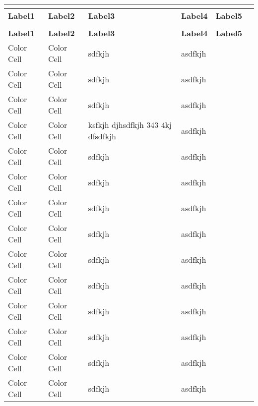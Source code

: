 \documentclass{article}
\begin{document}
\newpage
\renewcommand{\baselinestretch}{1.05}
\begin{center}
\LARGE
\keepXColumns
{}%
\begin{tabularx}{\textwidth}
{| Y@{} | s@{} | Y@{} | Y@{} | Y@{} | Y@{} |}
\\
\hline
\textbf{Label1} &\textbf{Label2} &\textbf{Label3} &\textbf{Label4} &\textbf{Label5}\\
\hline
\endfirsthead%
\\
\hline
\textbf{Label1} &\textbf{Label2} &\textbf{Label3} &\textbf{Label4} &\textbf{Label5}\\
\hline
\endhead%
Color Cell & Color Cell &sdfkjh  & asdfkjh & \\
\hline
Color Cell & Color Cell &sdfkjh  & asdfkjh & \\
\hline
Color Cell & Color Cell &sdfkjh  & asdfkjh & \\
\hline
Color Cell & Color Cell & ksfkjh djhsdfkjh 343 4kj dfsdfkjh  & asdfkjh & \\
\hline
Color Cell & Color Cell &sdfkjh  & asdfkjh & \\
\hline
Color Cell & Color Cell &sdfkjh  & asdfkjh & \\
\hline
Color Cell & Color Cell &sdfkjh  & asdfkjh & \\
\hline
Color Cell & Color Cell &sdfkjh  & asdfkjh & \\
\hline
Color Cell & Color Cell &sdfkjh  & asdfkjh & \\
\hline
Color Cell & Color Cell &sdfkjh  & asdfkjh & \\
\hline
Color Cell & Color Cell &sdfkjh  & asdfkjh & \\
\hline
Color Cell & Color Cell &sdfkjh  & asdfkjh & \\
\hline
Color Cell & Color Cell &sdfkjh  & asdfkjh & \\
\hline
Color Cell & Color Cell &sdfkjh  & asdfkjh & \\

\end{tabularx}
\end{center}
\end{document}
